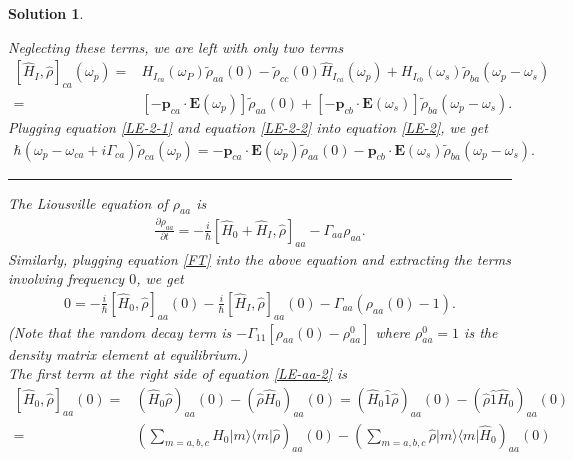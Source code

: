 \documentclass[UTF8,10pt,a4paper]{article}
\theoremstyle{Problem}
\theoremstyle{Solution}
\newtheorem*{sol}{Solution}
\begin{document}
\begin{sol}
\begin{enumerate}
        Neglecting these terms, we are left with only two terms
        \begin{align}
            \label{LE-2-2}
            \nonumber[\hat{H}_I,\hat{\rho}]_{ca}(\omega_p)=&H_{I_{ca}}(\omega_P)\tilde{\rho}_{aa}(0)-\tilde{\rho}_{cc}(0)\hat{H}_{I_{ca}}(\omega_p)+H_{I_{cb}}(\omega_s)\tilde{\rho}_{ba}(\omega_p-\omega_s)\\
            =&[-\bm{p}_{ca}\cdot\bm{E}(\omega_p)]\tilde{\rho}_{aa}(0)+[-\bm{p}_{cb}\cdot\bm{E}(\omega_s)]\tilde{\rho}_{ba}(\omega_p-\omega_s).
        \end{align}
        Plugging equation \eqref{LE-2-1} and equation \eqref{LE-2-2} into equation \eqref{LE-2}, we get
        \begin{align}
            \label{LE-3}
            \boxed{\hbar(\omega_p-\omega_{ca}+i\Gamma_{ca})\tilde{\rho}_{ca}(\omega_p)=-\bm{p}_{ca}\cdot\bm{E}(\omega_p)\tilde{\rho}_{aa}(0)-\bm{p}_{cb}\cdot\bm{E}(\omega_s)\tilde{\rho}_{ba}(\omega_p-\omega_s).}
        \end{align}
        \rule{\columnwidth}{1pt}
        The Liousville equation of \uline{$\rho_{aa}$} is
        \begin{align}
            \frac{\partial\rho_{aa}}{\partial t}=-\frac{i}{\hbar}[\hat{H}_0+\hat{H}_I,\hat{\rho}]_{aa}-\Gamma_{aa}\rho_{aa}.
        \end{align}
        Similarly, plugging equation \eqref{FT} into the above equation and extracting the terms involving frequency $0$, we get
        \begin{align}
            \label{LE-aa-2}
            0=-\frac{i}{\hbar}[\hat{H}_0,\hat{\rho}]_{aa}(0)-\frac{i}{\hbar}[\hat{H}_I,\hat{\rho}]_{aa}(0)-\Gamma_{aa}(\rho_{aa}(0)-1).
        \end{align}
        (Note that the random decay term is $-\Gamma_{11}[\rho_{aa}(0)-\rho_{aa}^0]$ where $\rho_{aa}^0=1$ is the density matrix element at equilibrium.)\\
        The first term at the right side of equation \eqref{LE-aa-2} is
        \begin{align}
            \label{LE-aa-2-1}
            \nonumber[\hat{H}_0,\hat{\rho}]_{aa}(0)=&(\hat{H}_0\hat{\rho})_{aa}(0)-(\hat{\rho}\hat{H}_0)_{aa}(0)=(\hat{H}_0\hat{1}\hat{\rho})_{aa}(0)-(\hat{\rho}\hat{1}\hat{H}_0)_{aa}(0)\\
            \nonumber=&\left(\sum_{m=a,b,c}\hat{H}_0\lvert m\rangle\langle m\rvert\hat{\rho}\right)_{aa}(0)-\left(\sum_{m=a,b,c}\hat{\rho}\lvert m\rangle\langle m\rvert\hat{H}_0\right)_{aa}(0)\\

\end{align}
\end{enumerate}
\end{sol}
\end{document}
